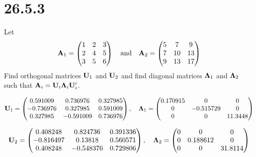 \section*{26.5.3}
Let
$${\bf A}_1=\left(\begin{matrix}
1 & 2 & 3\cr
2 & 4 & 5\cr
3 & 5 & 6
\end{matrix}\right)\quad\hbox{and}\quad{\bf A}_2=\left(\begin{matrix}
5 & 7 & 9\cr
7 & 10 & 13\cr
9 & 13 & 17
\end{matrix}\right)
$$
Find orthogonal matrices ${\bf U}_1$ and ${\bf U}_2$ and find
diagonal matrices ${\bf\Lambda}_1$ and ${\bf\Lambda}_2$ such that
${\bf A}_i={\bf U}_i{\bf\Lambda}_i{\bf U}_i'$.

\bigskip
\noindent
$${\bf U}_1=\left(\begin{matrix}
0.591009 & 0.736976 & 0.327985\cr
-0.736976 & 0.327985 & 0.591009\cr
0.327985 & -0.591009 & 0.736976
\end{matrix}\right),\quad
{\bf\Lambda}_1=\left(\begin{matrix}
0.170915 & 0 & 0\cr
0 & -0.515729 & 0\cr
0 & 0 & 11.3448
\end{matrix}\right)
$$

$$
{\bf U}_2=\left(\begin{matrix}
0.408248 & 0.824736 & 0.391336\cr
-0.816497 & 0.13818 & 0.560571\cr
0.408248 & -0.548376 & 0.729806
\end{matrix}\right),\quad
{\bf\Lambda}_2=\left(\begin{matrix}
0 & 0 & 0\cr
0 & 0.188612 & 0\cr
0 & 0 & 31.8114
\end{matrix}\right)
$$
